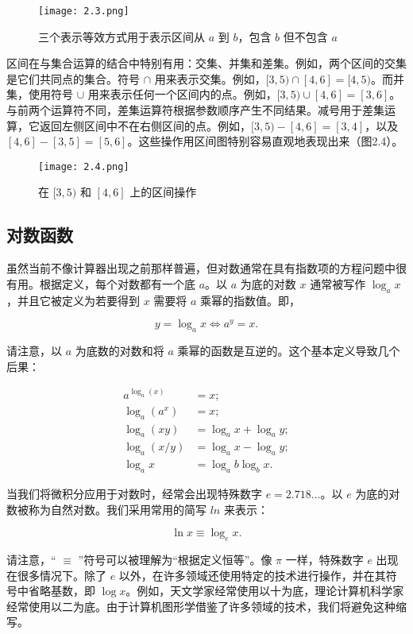 \documentclass[lang=cn,12pt]{elegantbook}
\begin{document}
\begin{figure}[htbp]
\centering
\texttt{[image: 2.3.png]}
\caption{三个表示等效方式用于表示区间从 $a$ 到 $b$，包含 $b$ 但不包含 $a$}
\end{figure}

区间在与集合运算的结合中特别有用：交集、并集和差集。例如，两个区间的交集是它们共同点的集合。符号 $\cap$ 用来表示交集。例如，$[3,5) \cap [4,6] = [4,5)$。而并集，使用符号 $\cup$ 用来表示任何一个区间内的点。例如，$[3,5) \cup [4,6] = [3,6]$。与前两个运算符不同，差集运算符根据参数顺序产生不同结果。减号用于差集运算，它返回左侧区间中不在右侧区间的点。例如，$[3,5) - [4,6] = [3,4]$，以及 $[4,6] - [3,5] = [5,6]$。这些操作用区间图特别容易直观地表现出来（图2.4）。

\begin{figure}[htbp]
\centering
\texttt{[image: 2.4.png]}
\caption{在 $[3,5)$ 和 $[4,6]$ 上的区间操作}
\end{figure}

\subsection{对数函数}

虽然当前不像计算器出现之前那样普遍，但对数通常在具有指数项的方程问题中很有用。根据定义，每个对数都有一个底 $a$。以 $a$ 为底的对数 $x$ 通常被写作 $\log_ax$，并且它被定义为若要得到 $x$ 需要将 $a$ 乘幂的指数值。即，

$$y = \log_ax \iff a^y = x. $$

请注意，以 $a$ 为底数的对数和将 $a$ 乘幂的函数是互逆的。这个基本定义导致几个后果：

$$
\begin{aligned}
a^{\log_a(x)} &= x; \\
\log_a(a^x) &= x; \\
\log_a(xy) &= \log_ax+\log_ay; \\
\log_a(x/y) &= \log_ax-\log_ay; \\
\log_ax &= \log_ab\log_bx.
\end{aligned}
$$

当我们将微积分应用于对数时，经常会出现特殊数字 $e=2.718...$。以 $e$ 为底的对数被称为自然对数。我们采用常用的简写 $ln$ 来表示：

$$\ln x \equiv \log_ex.$$

请注意，“ $\equiv$ ”符号可以被理解为“根据定义恒等”。像 $\pi$ 一样，特殊数字 $e$ 出现在很多情况下。除了 $e$ 以外，在许多领域还使用特定的技术进行操作，并在其符号中省略基数，即 $\log x$。例如，天文学家经常使用以十为底，理论计算机科学家经常使用以二为底。由于计算机图形学借鉴了许多领域的技术，我们将避免这种缩写。
\end{document}
